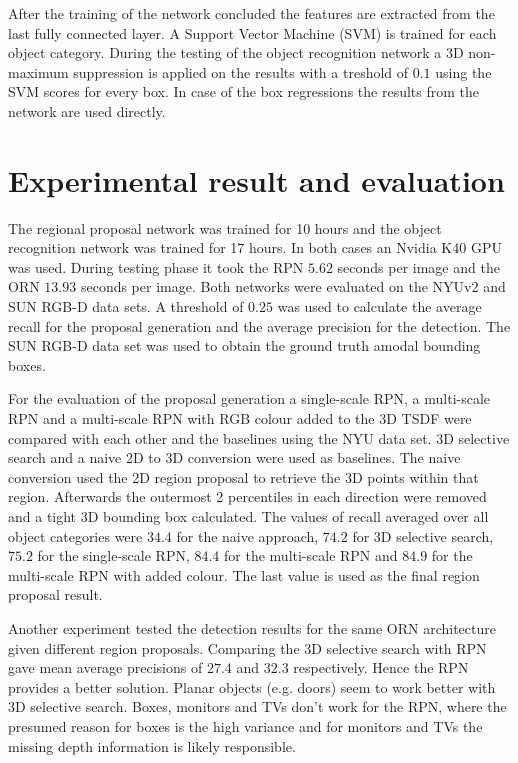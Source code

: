 \documentclass[12pt]{scrartcl}
\begin{document}
After the training of the network concluded the features are extracted from the last
fully connected layer. A Support Vector Machine (SVM) is trained for each object
category. During the testing of the object recognition network a 3D non-maximum
suppression is applied on the results with a treshold of \(0.1\) using the SVM
scores for every box. In case of the box regressions the results from the network
are used directly.

\section{Experimental result and evaluation}

The regional proposal network was trained for 10 hours and the object recognition
network was trained for 17 hours. In both cases an Nvidia K40 GPU was used.
During testing phase it took the RPN \(5.62\) seconds per image and the ORN
\(13.93\) seconds per image. Both networks were evaluated on the NYUv2\cite{Silberman2012}
and SUN RGB-D\cite{Song2015} data sets.
A threshold of \(0.25\) was used to calculate the average recall for the proposal
generation and the average precision for the detection. The SUN RGB-D data set
was used to obtain the ground truth amodal bounding boxes.

For the evaluation of the proposal generation a single-scale RPN, a multi-scale RPN
and a multi-scale RPN with RGB colour added to the 3D TSDF were compared with
each other and the baselines using the NYU data set. 3D selective search
and a naive 2D to 3D conversion were used as baselines. The naive conversion used the
2D region proposal to retrieve the 3D points within that region. Afterwards the
outermost 2 percentiles in each direction were removed and a tight 3D bounding
box calculated. The values of recall averaged over all object categories were
\(34.4\) for the naive approach, \(74.2\) for 3D selective search, \(75.2\) for
the single-scale RPN, \(84.4\) for the multi-scale RPN and \(84.9\) for the
multi-scale RPN with added colour. The last value is used as the final region
proposal result.

Another experiment tested the detection results for the same ORN architecture
given different region proposals. Comparing the 3D selective search with
RPN gave mean average precisions of \(27.4\) and \(32.3\) respectively. Hence
the RPN provides a better solution. Planar objects (e.g. doors) seem to work
better with 3D selective search. Boxes, monitors and TVs don't work for the RPN,
where the presumed reason for boxes is the high variance and for monitors and TVs
the missing depth information is likely responsible.
\end{document}
